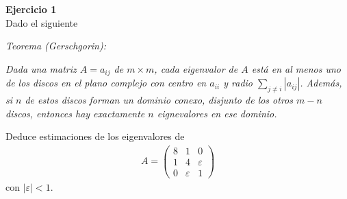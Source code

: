 \documentclass[a4paper, 11pt]{article}
\newenvironment{problem}[2][Ejercicio]
{ \begin{mdframed}[backgroundcolor= red!50] \textbf{#1 #2} \\}
	{  \end{mdframed}}
\begin{document}
	\setlength{\parskip}{\medskipamount}
	\setlength{\parindent}{0pt}

\begin{problem}{1}
    Dado el siguiente

    \textit{Teorema (Gerschgorin):}

    \textit{Dada una matriz $A = a_{ij}$ de $m \times m$, cada eigenvalor de $A$ está en al menos uno de los discos en el plano complejo con centro en $a_{ii}$ y radio $\sum_{j\neq i }|a_{ij}|$. Además, si $n$ de estos discos forman un dominio conexo, disjunto de los otros $m-n$ discos, entonces hay exactamente $n$ eignevalores en ese dominio.}

    Deduce estimaciones de los eigenvalores de 
    \begin{align*}
        A = \begin{pmatrix}
            8 &1  &0 \\ 
             1&4  &\varepsilon \\ 
            0  &\varepsilon  &1 
            \end{pmatrix}
    \end{align*}
    con $|\varepsilon|<1$.

\end{problem}
\end{document}
